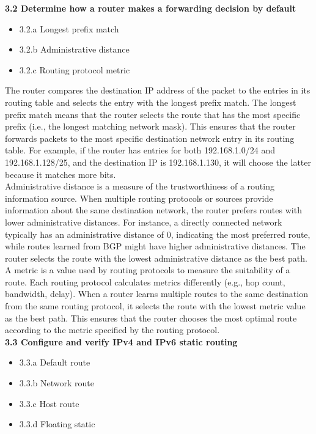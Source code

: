 \documentclass{article}
\begin{document}
\textbf{3.2 Determine how a router makes a forwarding decision by default}
\begin{itemize}
\item 3.2.a Longest prefix match
\item 3.2.b Administrative distance
\item 3.2.c Routing protocol metric
\end{itemize}

	The router compares the destination IP address of the packet to the entries in its routing table and selects the entry with the longest prefix match. The longest prefix match means that the router selects the route that has the most specific prefix (i.e., the longest matching network mask). This ensures that the router forwards packets to the most specific destination network entry in its routing table. For example, if the router has entries for both 192.168.1.0/24 and 192.168.1.128/25, and the destination IP is 192.168.1.130, it will choose the latter because it matches more bits.\\

	Administrative distance is a measure of the trustworthiness of a routing information source. When multiple routing protocols or sources provide information about the same destination network, the router prefers routes with lower administrative distances. For instance, a directly connected network typically has an administrative distance of 0, indicating the most preferred route, while routes learned from BGP might have higher administrative distances. The router selects the route with the lowest administrative distance as the best path.\\
	
	A metric is a value used by routing protocols to measure the suitability of a route. Each routing protocol calculates metrics differently (e.g., hop count, bandwidth, delay). When a router learns multiple routes to the same destination from the same routing protocol, it selects the route with the lowest metric value as the best path. This ensures that the router chooses the most optimal route according to the metric specified by the routing protocol.\\
  
\textbf{3.3 Configure and verify IPv4 and IPv6 static routing}
\begin{itemize}
\item 3.3.a Default route
\item 3.3.b Network route
\item 3.3.c Host route
\item 3.3.d Floating static
\end{itemize}
	
\end{document}
